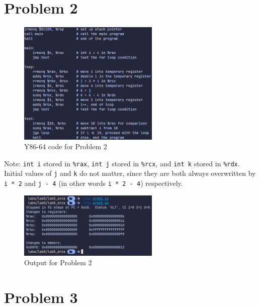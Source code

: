 \documentclass{article}
\begin{document}
\section*{Problem 2}

\begin{figure}[H]
    \centering
    \includegraphics[width=0.6\textwidth]{../images/prob2_code.png}
    \caption{Y86-64 code for Problem 2}
\end{figure}

Note: \texttt{int i} stored in \texttt{\%rax}, \texttt{int j} stored in \texttt{\%rcx}, and \texttt{int k} stored in \texttt{\%rdx}.
Initial values of \texttt{j} and \texttt{k} do not matter, since they are both always overwritten by \texttt{i * 2} and \texttt{j - 4} (in other words \texttt{i * 2 - 4}) respectively.

\begin{figure}[H]
    \centering
    \includegraphics[width=0.6\textwidth]{../images/prob2_out.png}
    \caption{Output for Problem 2}
\end{figure}

\section*{Problem 3}
\end{document}
